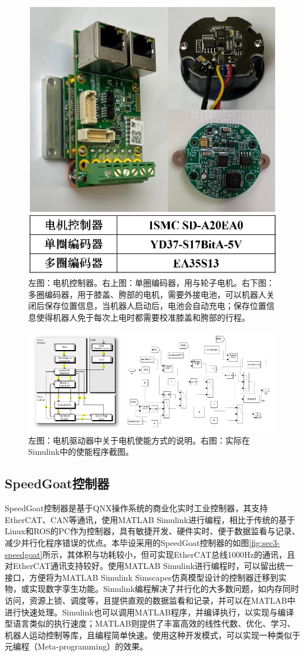 \begin{figure}[h!]
  \centering
  \includegraphics[width=0.6\linewidth]{figures/Sec3/escen.png}
  \caption{
  左图：电机控制器。右上图：单圈编码器，用与轮子电机。右下图：多圈编码器，用于膝盖、胯部的电机，需要外接电池，可以机器人关闭后保存位置信息，当机器人启动后，电池会自动充电；保存位置信息使得机器人免于每次上电时都需要校准膝盖和胯部的行程。
  }
  \label{fig:sec3-escen}
   \vspace{6pt}
\end{figure}

\begin{figure}
  \centering
  \includegraphics[width=0.85\linewidth]{figures/Sec3/motoren.png}
  \caption{
  左图：电机驱动器中关于电机使能方式的说明。右图：实际在Simulink中的使能程序截图。
  }
  \label{fig:sec3-motoren}
   \vspace{6pt}
\end{figure}

\subsection{SpeedGoat控制器}
SpeedGoat控制器是基于QNX操作系统的商业化实时工业控制器，其支持EtherCAT、CAN等通讯，使用MATLAB Simulink进行编程，相比于传统的基于Linux和ROS的PC作为控制器，具有敏捷开发、硬件实时、便于数据监看与记录、减少并行化程序错误的优点。本毕设采用的SpeedGoat控制器的如图\ref{fig:sec3-speedgoat}所示，其体积与功耗较小，但可实现EtherCAT总线1000Hz的通讯，且对EtherCAT通讯支持较好。使用MATLAB Simulink进行编程时，可以留出统一接口，方便将为MATLAB Simulink Simscapes仿真模型设计的控制器迁移到实物，或实现数字孪生功能。Simulink编程解决了并行化的大多数问题，如内存同时访问，资源上锁、调度等，且提供直观的数据监看和记录，并可以在MATLAB中进行快速处理。Simulink也可以调用MATLAB程序，并编译执行，以实现与编译型语言类似的执行速度；MATLAB则提供了丰富高效的线性代数、优化、学习、机器人运动控制等库，且编程简单快速。使用这种开发模式，可以实现一种类似于元编程（Meta-programming）的效果。

